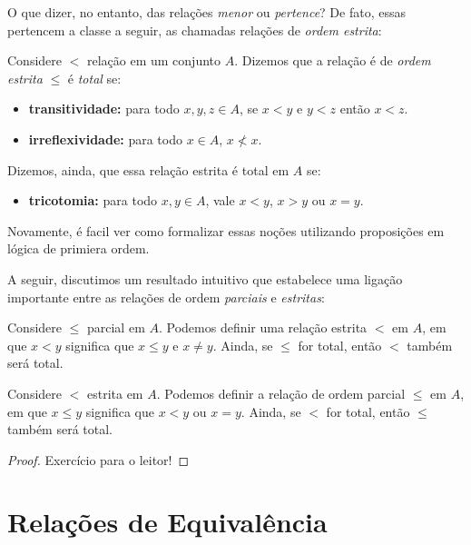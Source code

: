 O que dizer, no entanto, das relações \textit{menor} ou \textit{pertence}? De fato, essas pertencem a classe a seguir, as chamadas relações de \textit{ordem estrita}:

\begin{definition}
    \label{estrict_order}
    Considere $<$ relação em um conjunto $A$. Dizemos que a relação é de \textit{ordem estrita} $\leq$ é \textit{total} se:

    \begin{itemize}
        \item \textbf{transitividade: } para todo $x,y,z \in A$, se $x<y$ e $y<z$ então $x<z$.
        \item \textbf{irreflexividade: } para todo $x\in A$, $x \nless x$.
    \end{itemize}
    Dizemos, ainda, que essa relação estrita é total em $A$ se:
    \begin{itemize}
        \item \textbf{tricotomia:} para todo $x,y \in A$, vale $x<y$, $x>y$ ou $x=y$.
    \end{itemize}
\end{definition}

\noindent Novamente, é facil ver como formalizar essas noções utilizando proposições em lógica de primiera ordem.


A seguir, discutimos um resultado intuitivo que estabelece uma ligação importante entre as relações de ordem \textit{parciais} e \textit{estritas}:

\begin{theorem}
    \label{estrict_by_partial}
    Considere $\leq$ parcial em $A$. Podemos definir uma relação estrita $<$ em $A$, em que $x<y$ significa que $x\leq y$ e $x \neq y$. Ainda, se $\leq $ for total, então $<$ também será total.
\end{theorem}
\begin{theorem}
    \label{partial_by_estrict}
    Considere $<$ estrita em $A$. Podemos definir a relação de ordem parcial $\leq $ em $A$, em que $x\leq y$ significa que $x < y$ ou $x = y$. Ainda, se $<$ for total, então $\leq$ também será total.
\end{theorem}

\begin{proof}
    Exercício para o leitor!
\end{proof}

\section{Relações de Equivalência}


